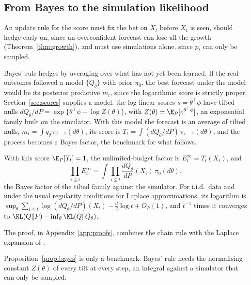 \subsection{From Bayes to the simulation likelihood}\label{sec:rules}\label{sec:exactbayes}\label{sec:simlik}

An update rule for the score must fix the bet on
$X_t$ before $X_t$ is seen, should hedge early on, since an overconfident
forecast can lose all the growth (Theorem~\ref{thm:growth}), and must use
simulations alone, since $p_t$ can only be sampled.

Bayes' rule hedges by averaging over what has not yet been learned. If the
real outcomes followed a model $\{Q_\theta\}$ with prior $\pi_0$, the best
forecast under the model would be its posterior predictive $m_t$, since the
logarithmic score is strictly proper. Section~\ref{sec:scores} supplies a
model: the log-linear scores $s = \theta^\top\phi$ have tilted nulls
$dQ_\theta/dP = \exp\{\theta^\top\phi - \log Z(\theta)\}$, with
$Z(\theta) = \E_P[e^{\theta^\top\phi}]$, an exponential family built on the
simulator. With this model the forecast is an average of tilted nulls,
$m_t = \int q_\theta\,\pi_{t-1}(d\theta)$, its score is
$T_t = \int (dQ_\theta/dP)\,\pi_{t-1}(d\theta)$, and the process becomes a
Bayes factor, the benchmark for what follows.

\begin{proposition}\label{prop:bayes}
With this score $\E_P[T_t] = 1$, the unlimited-budget factor is
$E_t^\infty = T_t(X_t)$, and
\[
\prod_{i\le t} E_i^\infty = \int \prod_{i \le t} \frac{dQ_\theta}{dP}(X_i)\,\pi_0(d\theta),
\]
the Bayes factor of the tilted family against the simulator. For i.i.d.\ data
and under the usual regularity conditions for Laplace approximations, its
logarithm is $\sup_\theta \sum_{i\le t}\log (dQ_\theta/dP)(X_i) - \frac{d}{2}\log t
+ O_P(1)$, and $t^{-1}$ times it converges to
$\KL(Q\|P) - \inf_\theta \KL(Q\|Q_\theta)$.
\end{proposition}

The proof, in Appendix~\ref{app:proofs}, combines the chain rule with the
Laplace expansion of \citet{clarke1990information}.

Proposition~\ref{prop:bayes} is only a benchmark: Bayes' rule needs the
normalising constant $Z(\theta)$ of every tilt at every step, an integral
against a simulator that can only be sampled.

